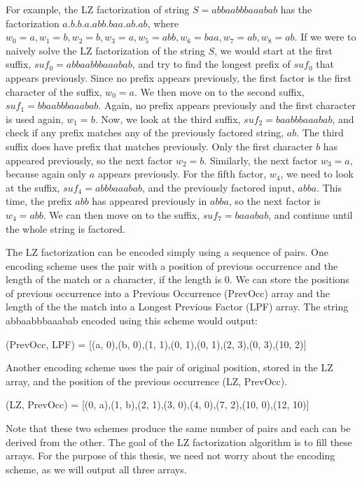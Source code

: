 For example, the LZ factorization of string $S=abbaabbbaaabab$ has the factorization $a.b.b.a.abb.baa.ab.ab$, where $w_0 = a, w_1 = b, w_2 = b, w_3 = a, w_5 = abb, w_6 = baa, w_7 = ab, w_8 = ab$. 
If we were to naively solve the LZ factorization of the string $S$, we would start at the first suffix, $suf_0=abbaabbbaaabab$, and try to find the longest prefix of $suf_0$ that appears previously.
Since no prefix appears previously, the first factor is the first character of the suffix, $w_0 = a$.
We then move on to the second suffix, $suf_1 = bbaabbbaaabab$.
Again, no prefix appears previously and the first character is used again, $w_1 = b$.
Now, we look at the third suffix, $suf_2 = baabbbaaabab$, and check if any prefix matches any of the previously factored string, $ab$.
The third suffix does have prefix that matches previously.
Only the first character $b$ has appeared previously, so the next factor $w_2 = b$.
Similarly, the next factor $w_3 = a$, because again only $a$ appears previously.
For the fifth factor, $w_4$, we need to look at the suffix, $suf_4 = abbbaaabab$, and the previously factored input, $abba$.
This time, the prefix $abb$ has appeared previously in $abba$, so the next factor is $w_4 = abb$.
We can then move on to the suffix, $suf_7 = baaabab$, and continue until the whole string is factored.

The LZ factorization can be encoded simply using a sequence of pairs.
One encoding scheme uses the pair with a position of previous occurrence and the length of the match or a character, if the length is 0.
We can store the positions of previous occurrence into a Previous Occurrence (PrevOcc) array and the length of the the match into a Longest Previous Factor (LPF) array.
The string abbaabbbaaabab encoded using this scheme would output:\\
\centerline{(PrevOcc, LPF) = [(a, 0),(b, 0),(1, 1),(0, 1),(0, 1),(2, 3),(0, 3),(10, 2)]}
Another encoding scheme uses the pair of original position, stored in the LZ array, and the position of the previous occurrence (LZ, PrevOcc).\\
\centerline{(LZ, PrevOcc) = [(0, a),(1, b),(2, 1),(3, 0),(4, 0),(7, 2),(10, 0),(12, 10)]}
Note that these two schemes produce the same number of pairs and each can be derived from the other.
The goal of the LZ factorization algorithm is to fill these arrays.
For the purpose of this thesis, we need not worry about the encoding scheme, as we will output all three arrays.

